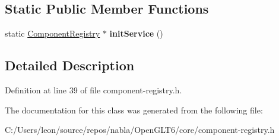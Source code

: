 \subsection*{Static Public Member Functions}
\begin{DoxyCompactItemize}
\item 
\mbox{\label{classnabla_1_1_component_registry_ad3bcf27ad62f7628ac2e69affab26a9e}} 
static \mbox{\hyperlink{classnabla_1_1_component_registry}{Component\+Registry}} $\ast$ {\bfseries init\+Service} ()
\end{DoxyCompactItemize}


\subsection{Detailed Description}


Definition at line 39 of file component-\/registry.\+h.



The documentation for this class was generated from the following file\+:\begin{DoxyCompactItemize}
\item 
C\+:/\+Users/leon/source/repos/nabla/\+Open\+G\+L\+T6/core/component-\/registry.\+h\end{DoxyCompactItemize}
